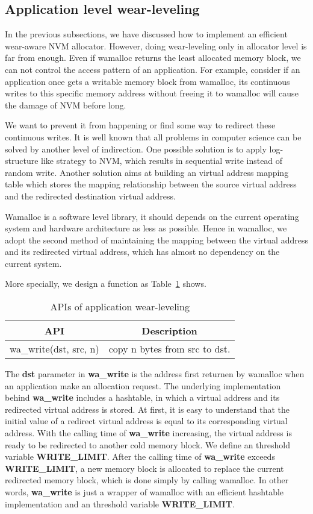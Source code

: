 \documentclass{vldb}
\begin{document}
\subsection{Application level wear-leveling}

In the previous subsections, we have discussed how to implement an efficient wear-aware NVM allocator.
However, doing wear-leveling only in allocator level is far from enough.
Even if wamalloc returns the least allocated memory block, we can not control the access pattern of an application.  
For example, consider if an application once gets a writable memory block from wamalloc,
its continuous writes to this specific memory address without freeing it to wamalloc will cause the damage of NVM before long.

We want to prevent it from happening or find some way to redirect these continuous writes.
It is well known that all problems in computer science can be solved by another level of indirection.
One possible solution is to apply log-structure like strategy\cite{rumble2014log} to NVM, 
which results in sequential write instead of random write.
Another solution aims at building an virtual address mapping table which stores the mapping relationship between the source virtual address and the redirected destination virtual address\cite{shao2012ptl}.

Wamalloc is a software level library, it should depends on the current operating system and hardware architecture as less as possible.
Hence in wamalloc, we adopt the second method of maintaining the mapping between the virtual address and its redirected virtual address,
which has almost no dependency on the current system.

More specially, we design a function as Table~\ref{tab:api} shows.

\begin{table}[h]
\centering
\caption{APIs of application wear-leveling}
\begin{tabular}{|c|c|} \hline
API&Description\\ \hline
    wa\_write(dst, src, n)& copy n bytes from src to dst.\\ \hline
\end{tabular}
\label{tab:api}
\end{table}

The \textbf{dst} parameter in \textbf{wa\_write} is the address first returnen by wamalloc when an application make an allocation request.
The underlying implementation behind \textbf{wa\_write} includes a hashtable, in which a virtual address and its redirected virtual address is stored.
At first, it is easy to understand that the initial value of a redirect virtual address is equal to its corresponding virtual address.
With the calling time of \textbf{wa\_write} increasing, the virtual address is ready to be redirected to another cold memory block.
We define an threshold variable \textbf{WRITE\_LIMIT}.
After the calling time of \textbf{wa\_write} exceeds \textbf{WRITE\_LIMIT}, 
a new memory block is allocated to replace the current redirected memory block, which is done simply by calling wamalloc.
In other words, \textbf{wa\_write} is just a wrapper of wamalloc with an efficient hashtable implementation and an threshold variable \textbf{WRITE\_LIMIT}.
\end{document}
